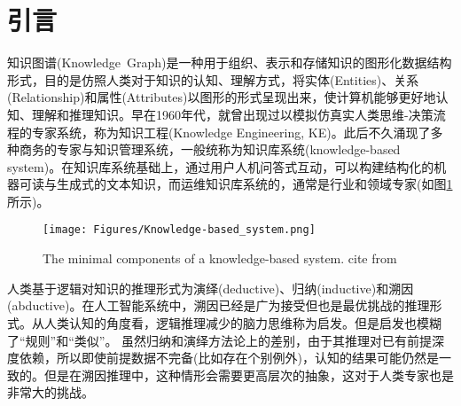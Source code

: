 \section{引言}
知识图谱\textrm{(Knowledge~Graph)}是一种用于组织、表示和存储知识的图形化数据结构形式，目的是仿照人类对于知识的认知、理解方式，将实体\textrm{(Entities)}、关系\textrm{(Relationship)}和属性\textrm{(Attributes)}以图形的形式呈现出来，使计算机能够更好地认知、理解和推理知识。早在1960年代，就曾出现过以模拟仿真实人类思维-决策流程的专家系统，称为知识工程\textrm{(Knowledge Engineering, KE)}。此后不久涌现了多种商务的专家与知识管理系统，一般统称为知识库系统\textrm{(knowledge-based system)}。在知识库系统基础上，通过用户人机问答式互动，可以构建结构化的机器可读与生成式的文本知识，而运维知识库系统的，通常是行业和领域专家(如图\ref{Fig:Knowledge-based_system}所示)。
\begin{figure}[h!]
\centering
\texttt{[image: Figures/Knowledge-based\_system.png]}
\caption{\small\textrm{The minimal components of a knowledge-based system. cite from~\cite{ACR56-128_2023}}}%
\label{Fig:Knowledge-based_system}
\end{figure}

人类基于逻辑对知识的推理形式为演绎\textrm{(deductive)}、归纳\textrm{(inductive)}和溯因\textrm{(abductive)}。在人工智能系统中，溯因已经是广为接受但也是最优挑战的推理形式。从人类认知的角度看，逻辑推理减少的脑力思维称为启发。但是启发也模糊了“规则”和“类似”。 虽然归纳和演绎方法论上的差别，由于其推理对已有前提深度依赖，所以即使前提数据不完备(比如存在个别例外)，认知的结果可能仍然是一致的。但是在溯因推理中，这种情形会需要更高层次的抽象，这对于人类专家也是非常大的挑战。

